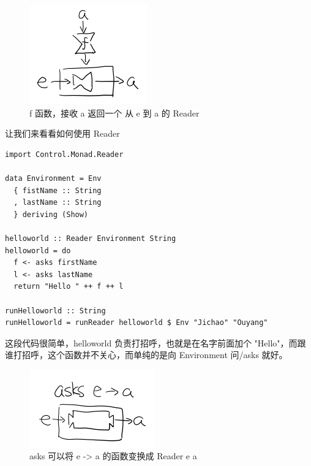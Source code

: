 \documentclass[11pt]{tufte-book}
\begin{document}
\begin{figure}[htbp]
\centering
\includegraphics[width=.9\linewidth]{images/p2-reader-monad.png}
\caption{f 函数，接收 a 返回一个 从 e 到 a 的 Reader}
\end{figure}

让我们来看看如何使用 Reader
\begin{verbatim}
import Control.Monad.Reader

data Environment = Env
  { fistName :: String
  , lastName :: String
  } deriving (Show)

helloworld :: Reader Environment String
helloworld = do
  f <- asks firstName
  l <- asks lastName
  return "Hello " ++ f ++ l

runHelloworld :: String
runHelloworld = runReader helloworld $ Env "Jichao" "Ouyang"
\end{verbatim}

这段代码很简单，helloworld 负责打招呼，也就是在名字前面加个 "Hello"，而跟谁打招呼，这个函数并不关心，而单纯的是向 Environment 问/asks 就好。

\begin{figure}[htbp]
\centering
\includegraphics[width=.9\linewidth]{images/p2-reader-monad-ask.png}
\caption{asks 可以将 e -> a 的函数变换成 Reader e a}
\end{figure}
\end{document}
